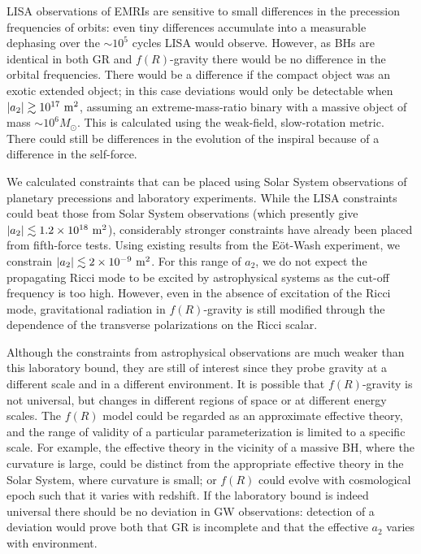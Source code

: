 LISA observations of EMRIs are sensitive to small differences in the precession frequencies of orbits: even tiny differences accumulate into a measurable dephasing over the $\sim 10^5$ cycles LISA would observe. However, as BHs are identical in both GR and $f(R)$-gravity there would be no difference in the orbital frequencies. There would be a difference if the compact object was an exotic extended object; in this case deviations would only be detectable when $|a_2| \gtrsim 10^{17}~\mathrm{m^2}$, assuming an extreme-mass-ratio binary with a massive object of mass $\sim 10^6 M_\odot$. This is calculated using the weak-field, slow-rotation metric. There could still be differences in the evolution of the inspiral because of a difference in the self-force.

We calculated constraints that can be placed using Solar System observations of planetary precessions and laboratory experiments. While the LISA constraints could beat those from Solar System observations (which presently give $|a_2| \lesssim 1.2 \times 10^{18}~\mathrm{m^2}$), considerably stronger constraints have already been placed from fifth-force tests. Using existing results from the E\"ot-Wash experiment, we constrain $|a_2| \lesssim 2 \times 10^{-9}~\mathrm{m^2}$. For this range of $a_2$, we do not expect the propagating Ricci mode to be excited by astrophysical systems as the cut-off frequency is too high. However, even in the absence of excitation of the Ricci mode, gravitational radiation in $f(R)$-gravity is still modified through the dependence of the transverse polarizations on the Ricci scalar. 

Although the constraints from astrophysical observations are much weaker than this laboratory bound, they are still of interest since they probe gravity at a different scale and in a different environment. It is possible that $f(R)$-gravity is not universal, but changes in different regions of space or at different energy scales. The $f(R)$ model could be regarded as an approximate effective theory, and the range of validity of a particular parameterization is limited to a specific scale. For example, the effective theory in the vicinity of a massive BH, where the curvature is large, could be distinct from the appropriate effective theory in the Solar System, where curvature is small; or $f(R)$ could evolve with cosmological epoch such that it varies with redshift. If the laboratory bound is indeed universal there should be no deviation in GW observations: detection of a deviation would prove both that GR is incomplete and that the effective $a_2$ varies with environment.

